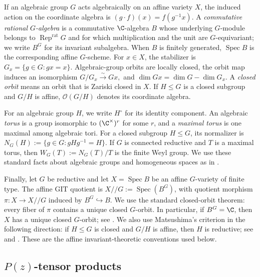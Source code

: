 \documentclass[12pt,leqno]{amsart}
\numberwithin{equation}{section} \newtheorem{thm}{Theorem}[section] \newtheorem{lem}[thm]{Lemma} \newtheorem{ex}[thm]{Example} \newtheorem{prop}[thm]{Proposition} \newtheorem{cor}[thm]{Corollary} \newtheorem{defi}[thm]{Definition} \newtheorem{rmk}[thm]{Remark} \newtheorem{notation}[thm]{Notation}
\newcommand{\Rep}{\operatorname{Rep}}
\newcommand{\Spec}{\operatorname{Spec}}
\newcommand{\OO}{\mathcal O}
\begin{document}
If an algebraic group $G$ acts algebraically on an affine variety $X$, the induced action on the coordinate algebra is \((g\cdot f)(x)=f(g^{-1}x)\). A \emph{commutative rational $G$-algebra} is a commutative $\C$-algebra $B$ whose underlying $G$-module belongs to $\Rep^{\mathrm{rat}}G$ and for which multiplication and the unit are $G$-equivariant; we write $B^G$ for its invariant subalgebra. When $B$ is finitely generated, $\Spec B$ is the corresponding affine $G$-scheme. For $x\in X$, the stabilizer is \(G_x=\{g\in G:gx=x\}\). Algebraic-group orbits are locally closed, the orbit map induces an isomorphism \(G/G_x\overset{\sim}{\longrightarrow}Gx,\) and \(\dim Gx=\dim G-\dim G_x.\) A \emph{closed orbit} means an orbit that is Zariski closed in $X$. If $H\leq G$ is a closed subgroup and $G/H$ is affine, $\OO(G/H)$ denotes its coordinate algebra.

For an algebraic group $H$, we write $H^\circ$ for its identity component. An algebraic \emph{torus} is a group isomorphic to $(\C^\times)^r$ for some $r$, and a \emph{maximal torus} is one maximal among algebraic tori. For a closed subgroup $H\leq G$, its normalizer is \(N_G(H):=\{g\in G:gHg^{-1}=H\}.\) If $G$ is connected reductive and $T$ is a maximal torus, then \(W_G(T):=N_G(T)/T\) is the finite Weyl group. We use these standard facts about algebraic groups and homogeneous spaces as in \cite[Chapters~1--2]{SpringerLAG}.

Finally, let $G$ be reductive and let $X=\Spec B$ be an affine $G$-variety of finite type. The affine GIT quotient is \(X/\!/G:=\Spec(B^G)\), with quotient morphism \(\pi:X\to X/\!/G\) induced by $B^G\hookrightarrow B$. We use the standard closed-orbit theorem: every fiber of $\pi$ contains a unique closed $G$-orbit. In particular, if $B^G=\C$, then $X$ has a unique closed $G$-orbit; see \cite[Chapter~1, \S1]{MFK}. We also use Matsushima's criterion in the following direction: if $H\leq G$ is closed and $G/H$ is affine, then $H$ is reductive; see \cite{Matsushima} and \cite[Theorem~3.5]{BHC}. These are the affine invariant-theoretic conventions used below.

\subsection{\texorpdfstring{$P(z)$}{P(z)}-tensor products}
\end{document}
